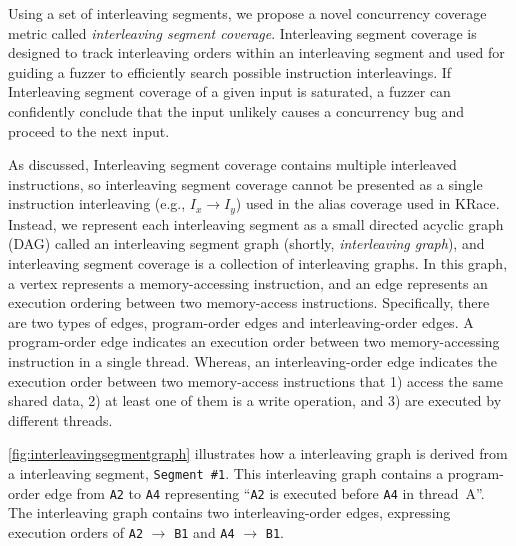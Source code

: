 \newcommand{\mutable}{mutable edge\xspace}
\newcommand{\mutables}{mutable edges\xspace}
\newcommand{\immutable}{immutable edge\xspace}
\newcommand{\immutables}{immutable edges\xspace}
\newcommand{\intcov}{interleaving segment coverage\xspace}
\newcommand{\Intcov}{Interleaving segment coverage\xspace}


Using a set of interleaving segments, we propose a novel concurrency coverage metric called \textit{\intcov}.
\Intcov is designed to track interleaving orders
within an interleaving segment and used for guiding a fuzzer to  
efficiently search possible instruction interleavings.
If \Intcov of a given input is saturated, 
a fuzzer can confidently conclude that the input unlikely causes a concurrency bug and proceed to the next input.

As discussed, \Intcov contains multiple interleaved instructions, 
so \intcov cannot be presented as a single instruction interleaving 
(e.g., $I_x \rightarrow I_y$) used in the alias coverage used in KRace.
Instead, we represent each interleaving segment as a small directed acyclic
graph (DAG) called an interleaving segment graph (shortly, \textit{interleaving graph}), and \intcov is a collection of interleaving graphs.
%
In this graph, a vertex represents a memory-accessing instruction, 
and an edge represents an execution ordering between two memory-access instructions. 
Specifically, there are two types of edges, program-order edges and
interleaving-order edges.
%
A program-order edge indicates an execution order between two 
memory-accessing instruction in a single thread.
Whereas, an interleaving-order edge indicates the execution
order between two memory-access instructions that 1) access the same
shared data, 2) at least one of them is a write operation, and 3) are
executed by different threads.

\autoref{fig:interleavingsegmentgraph} illustrates how a interleaving 
graph is derived from a interleaving segment, \texttt{Segment \#1}.
This interleaving graph contains a program-order edge from \texttt{A2} to
\texttt{A4} representing ``\texttt{A2} is executed before \texttt{A4}
in thread~A''.
The interleaving graph contains two interleaving-order
edges, expressing execution orders of \texttt{A2} $\rightarrow$ \texttt{B1}
and \texttt{A4} $\rightarrow$ \texttt{B1}.



